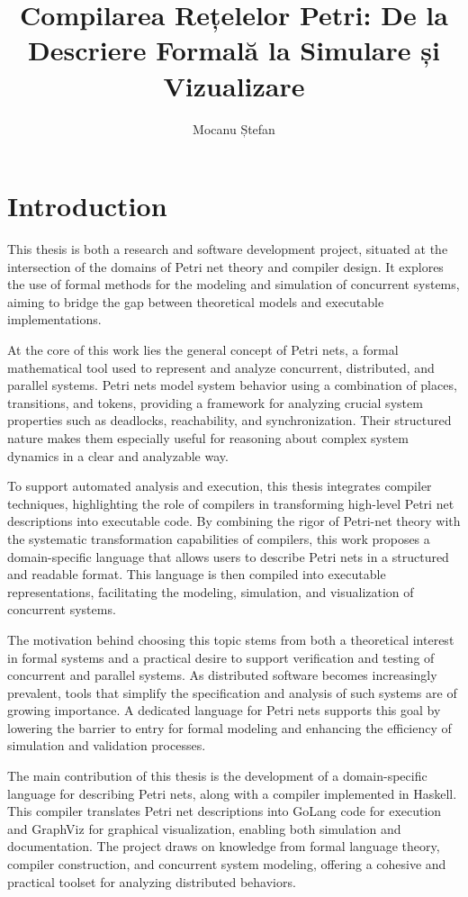 \documentclass[12pt]{article}
\title{Compilarea Rețelelor Petri: De la Descriere Formală la Simulare și Vizualizare}
\author{Mocanu Ștefan}
\begin{document}

\restoregeometry
{}



\tableofcontents
\newpage
\section{Introduction}
This thesis is both a research and software development project, situated at the intersection of the domains of Petri net theory and compiler design. It explores the use of formal methods for the modeling and simulation of concurrent systems, aiming to bridge the gap between theoretical models and executable implementations.

At the core of this work lies the general concept of Petri nets, a formal mathematical tool used to represent and analyze concurrent, distributed, and parallel systems. Petri nets model system behavior using a combination of places, transitions, and tokens, providing a framework for analyzing crucial system properties such as deadlocks, reachability, and synchronization. Their structured nature makes them especially useful for reasoning about complex system dynamics in a clear and analyzable way.

To support automated analysis and execution, this thesis integrates compiler techniques, highlighting the role of compilers in transforming high-level Petri net descriptions into executable code. By combining the rigor of Petri-net theory with the systematic transformation capabilities of compilers, this work proposes a domain-specific language that allows users to describe Petri nets in a structured and readable format. This language is then compiled into executable representations, facilitating the modeling, simulation, and visualization of concurrent systems.

The motivation behind choosing this topic stems from both a theoretical interest in formal systems and a practical desire to support verification and testing of concurrent and parallel systems. As distributed software becomes increasingly prevalent, tools that simplify the specification and analysis of such systems are of growing importance. A dedicated language for Petri nets supports this goal by lowering the barrier to entry for formal modeling and enhancing the efficiency of simulation and validation processes.

The main contribution of this thesis is the development of a domain-specific language for describing Petri nets, along with a compiler implemented in Haskell. This compiler translates Petri net descriptions into GoLang code for execution and GraphViz for graphical visualization, enabling both simulation and documentation. The project draws on knowledge from formal language theory, compiler construction, and concurrent system modeling, offering a cohesive and practical toolset for analyzing distributed behaviors.
\end{document}
